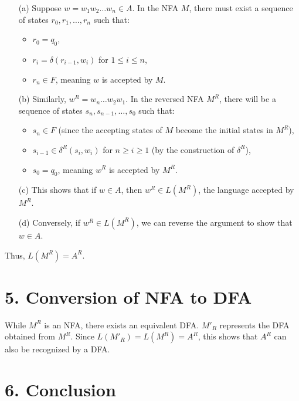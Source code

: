 \documentclass[12pt]{article}
\begin{document}
\begin{itemize}
    \item[(a)] Suppose \( w = w_1 w_2 \ldots w_n \in A \). In the NFA \( M \), there must exist a sequence of states \( r_0, r_1, \ldots, r_n \) such that:
    \begin{itemize}
        \item \( r_0 = q_0 \),
        \item \( r_i = \delta(r_{i-1}, w_i) \) for \( 1 \leq i \leq n \),
        \item \( r_n \in F \), meaning \( w \) is accepted by \( M \).
    \end{itemize}
    
    \item[(b)] Similarly, \( w^R = w_n \ldots w_2 w_1 \). In the reversed NFA \( M^R \), there will be a sequence of states \( s_n, s_{n-1}, \ldots, s_0 \) such that:
    \begin{itemize}
        \item \( s_n \in F \) (since the accepting states of \( M \) become the initial states in \( M^R \)),
        \item \( s_{i-1} \in \delta^R(s_i, w_i) \) for \( n \geq i \geq 1 \) (by the construction of \( \delta^R \)),
        \item \( s_0 = q_0 \), meaning \( w^R \) is accepted by \( M^R \).
    \end{itemize}
    
    \item[(c)] This shows that if \( w \in A \), then \( w^R \in L(M^R) \), the language accepted by \( M^R \).
    
    \item[(d)] Conversely, if \( w^R \in L(M^R) \), we can reverse the argument to show that \( w \in A \).
\end{itemize}

Thus, \( L(M^R) = A^R \).

\section*{5. Conversion of NFA to DFA}

While \( M^R \) is an NFA, there exists an equivalent DFA.  \( M'_R \) represents the DFA obtained from \( M^R \). Since \( L(M'_R) = L(M^R) = A^R \), this shows that \( A^R \) can also be recognized by a DFA.

\section*{6. Conclusion}
\end{document}
